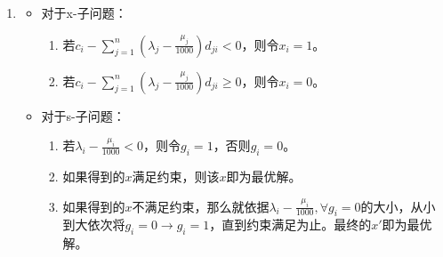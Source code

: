\documentclass[10pt]{article}
\begin{document}
\begin{enumerate}
\begin{itemize}
	\item s-子问题
	\begin{equation}
		\begin{aligned}
			\min_{{\bf x}}\quad &\sum_{i=1}^n(\lambda_i-\frac{\mu_i}{1000})g_i \\
			s.t. \quad & \sum_{i=1}^n g_ip_i \ge \alpha \sum_{i=1}^n p_i \quad \text{(覆盖率达到$\alpha$)}\\ 
			\quad &g_{i}\in \{0,1\},\lambda,\mu \ge 0
		\end{aligned}
	\end{equation}
	\end{itemize}
	\item 
	\begin{itemize}
		\item 对于x-子问题：
			\begin{enumerate}
				\item 若$ c_i-\sum_{j=1}^n(\lambda_j-\frac{\mu_j}{1000})d_{ji}< 0$，则令$x_i=1$。
				\item 若$ c_i-\sum_{j=1}^n(\lambda_j-\frac{\mu_j}{1000})d_{ji}\ge 0$，则令$x_i=0$。
			\end{enumerate}
		\item 对于s-子问题：
			\begin{enumerate}
				\item 若$\lambda_i-\frac{\mu_i}{1000} < 0$，则令$g_i=1$，否则$g_i=0$。
				\item 如果得到的$x$满足约束，则该$x$即为最优解。
				\item 如果得到的$x$不满足约束，那么就依据$\lambda_i-\frac{\mu_i}{1000},\forall g_i = 0$的大小，从小到大依次将$g_i=0\rightarrow g_i=1$，直到约束满足为止。最终的$x'$即为最优解。
			\end{enumerate}
	\end{itemize}
\end{enumerate}
\end{document}
